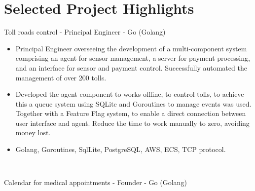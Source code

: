 \documentclass[letterpaper]{twentysecondcv} %
\begin{document}
\begin{twentyla} %

\end{twentyla}





\section{Selected Project Highlights}
\begin{twenty}

     \twentyitem
    
    
    {Toll roads control - Principal Engineer - Go (Golang)}
    {\href{}{}}
    {}
    {
    
        \begin{itemize}
            \item
	    Principal Engineer overseeing the development of a multi-component system comprising an agent for sensor management, a server for payment processing, and an interface for sensor and payment control. Successfully automated the management of over 200 tolls.
         \end{itemize}
         
        \begin{itemize}
            \item
            Developed the agent component to works offline, to control tolls, to achieve this a queue system using SQLite and Goroutines to manage events was used. 	Together with a Feature Flag system, to enable a direct connection between user interface and agent. Reduce the time to work manually to zero, avoiding money lost.
         \end{itemize} 
         
         \begin{itemize}
            \item
            Golang, Goroutines, SqlLite, PostgreSQL, AWS, ECS, TCP protocol.
         \end{itemize}
         
    }
    \\
    
     \twentyitem

    
    {Calendar for medical appointments - Founder - Go (Golang)}
    {\href{}{}}
    {}
    {
    
}
\end{twenty}
\end{document}
